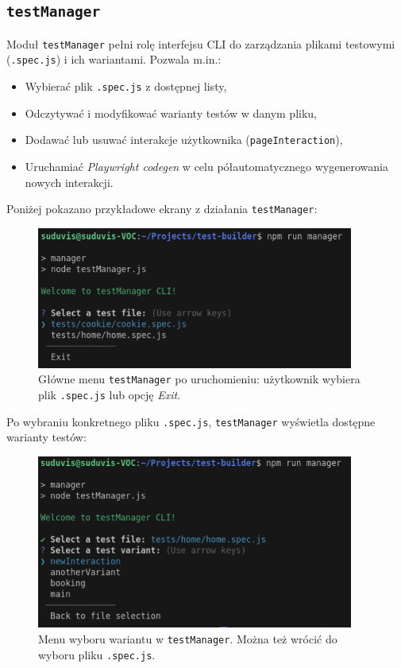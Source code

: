 \documentclass[12pt]{report}
\begin{document}
\subsection{\texttt{testManager}} %
\label{sec:testManager}

Moduł \texttt{testManager} pełni rolę interfejsu CLI do zarządzania plikami testowymi (\texttt{.spec.js}) i ich wariantami. Pozwala m.in.:
\begin{itemize}
    \item Wybierać plik \texttt{.spec.js} z dostępnej listy,
    \item Odczytywać i modyfikować warianty testów w danym pliku,
    \item Dodawać lub usuwać interakcje użytkownika (\texttt{pageInteraction}),
    \item Uruchamiać \emph{Playwright codegen} w celu półautomatycznego wygenerowania nowych interakcji.
\end{itemize}

Poniżej pokazano przykładowe ekrany z działania \texttt{testManager}:

\begin{figure}[H]
\centering
\includegraphics[width=0.93\textwidth]{tm_main_menu.png}
\caption{Główne menu \texttt{testManager} po uruchomieniu: użytkownik wybiera plik \texttt{.spec.js} lub opcję \textit{Exit}.}
\label{fig:tm_main_menu}
\end{figure}

Po wybraniu konkretnego pliku \texttt{.spec.js}, \texttt{testManager} wyświetla dostępne warianty testów:

\begin{figure}[H]
\centering
\includegraphics[width=0.93\textwidth]{tm_variant_selection_menu.png}
\caption{Menu wyboru wariantu w \texttt{testManager}. Można też wrócić do wyboru pliku \texttt{.spec.js}.}
\label{fig:tm_variant_selection_menu}
\end{figure}
\end{document}
